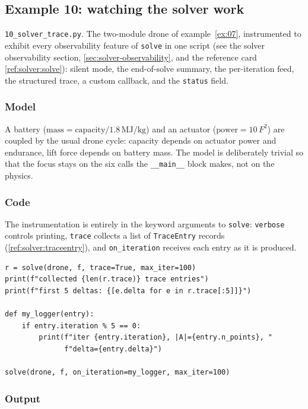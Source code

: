 \documentclass[11pt,a4paper]{article}
\begin{document}
\subsection{Example 10: watching the solver work}
\label{ex:10}

\texttt{10\_solver\_trace.py}. The two-module drone of
example~\ref{ex:07}, instrumented to exhibit every observability
feature of \texttt{solve} in one script (see the solver observability
section, \ref{sec:solver-observability}, and the reference card
\ref{ref:solver:solve}): silent mode, the end-of-solve summary, the
per-iteration feed, the structured trace, a custom callback, and the
\texttt{status} field.

\subsubsection*{Model}

A battery ($\text{mass} = \text{capacity}/1.8\,\text{MJ/kg}$) and an
actuator ($\text{power} = 10\,F^2$) are coupled by the usual drone
cycle: capacity depends on actuator power and endurance, lift force
depends on battery mass. The model is deliberately trivial so that the
focus stays on the six calls the \texttt{\_\_main\_\_} block makes, not
on the physics.

\subsubsection*{Code}

The instrumentation is entirely in the keyword arguments to
\texttt{solve}: \texttt{verbose} controls printing, \texttt{trace}
collects a list of \texttt{TraceEntry} records
(\ref{ref:solver:traceentry}), and \texttt{on\_iteration} receives each
entry as it is produced.

\begin{lstlisting}
r = solve(drone, f, trace=True, max_iter=100)
print(f"collected {len(r.trace)} trace entries")
print(f"first 5 deltas: {[e.delta for e in r.trace[:5]]}")

def my_logger(entry):
    if entry.iteration % 5 == 0:
        print(f"iter {entry.iteration}, |A|={entry.n_points}, "
              f"delta={entry.delta}")

solve(drone, f, on_iteration=my_logger, max_iter=100)
\end{lstlisting}

\subsubsection*{Output}
\end{document}
